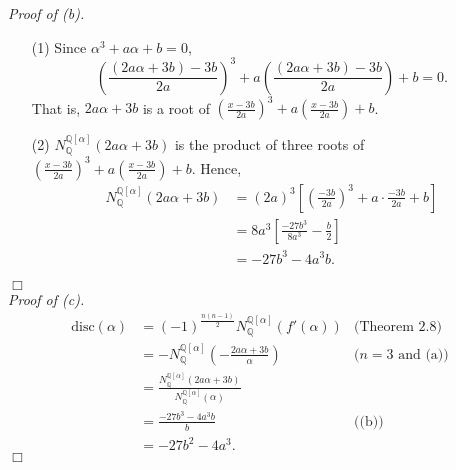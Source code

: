 \documentclass{article}
\begin{document}
\emph{Proof of (b).}
\begin{enumerate}
\item[(1)]
Since $\alpha^3 + a\alpha + b = 0$,
$$\left( \frac{(2a\alpha+3b)-3b}{2a} \right)^3
  + a\left( \frac{(2a\alpha+3b)-3b}{2a} \right) + b = 0.$$
That is, $2a\alpha+3b$ is a root of
$\left( \frac{x-3b}{2a} \right)^3 + a\left( \frac{x-3b}{2a} \right) + b$.
\item[(2)]
$N_{\mathbb{Q}}^{\mathbb{Q}[\alpha]}(2a\alpha+3b)$ is the product of three roots of
$\left( \frac{x-3b}{2a} \right)^3 + a\left( \frac{x-3b}{2a} \right) + b$.
Hence,
\begin{align*}
N_{\mathbb{Q}}^{\mathbb{Q}[\alpha]}(2a\alpha+3b)
&= (2a)^3\left[ \left(\frac{-3b}{2a}\right)^3 + a \cdot \frac{-3b}{2a} + b \right] \\
&= 8a^3\left[ \frac{-27b^3}{8a^3} - \frac{b}{2} \right] \\
&= -27b^3-4a^3b.
\end{align*}
\end{enumerate}
$\Box$ \\

\emph{Proof of (c).}
\begin{align*}
\text{disc}(\alpha)
&= (-1)^{\frac{n(n-1)}{2}} N_{\mathbb{Q}}^{\mathbb{Q}[\alpha]}(f'(\alpha))
  &\text{(Theorem 2.8)} \\
&= - N_{\mathbb{Q}}^{\mathbb{Q}[\alpha]}\left( -\frac{2a\alpha+3b}{\alpha} \right)
  &\text{($n=3$ and (a))} \\
&= \frac{N_{\mathbb{Q}}^{\mathbb{Q}[\alpha]}(2a\alpha+3b)}
  {N_{\mathbb{Q}}^{\mathbb{Q}[\alpha]}(\alpha)} \\
&= \frac{-27b^3-4a^3b}{b}
  &\text{((b))} \\
&= -27b^2-4a^3.
\end{align*}
$\Box$ \\
\end{document}
